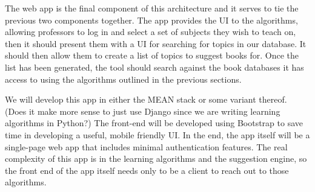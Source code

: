 
The web app is the final component of this architecture and it serves to tie the previous two components together.
The app provides the UI to the algorithms, allowing professors to log in and select a set of subjects they wish to teach on, then it should present them with a UI for searching for topics in our database.  
It should then allow them to create a list of topics to suggest books for.
Once the list has been generated, the tool should search against the book databases it has access to using the algorithms outlined in the previous sections.

We will develop this app in either the MEAN stack or some variant thereof.  (Does it make more sense to just use Django since we are writing learning algorithms in Python?)
The front-end will be developed using Bootstrap to save time in developing a useful, mobile friendly UI.
In the end, the app itself will be a single-page web app that includes minimal authentication features.  
The real complexity of this app is in the learning algorithms and the suggestion engine, so the front end of the app itself needs only to be a client to reach out to those algorithms.  